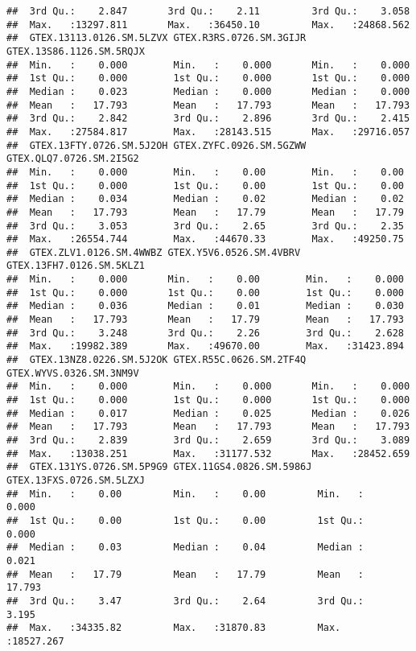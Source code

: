 \documentclass[
]{article}
\begin{document}
\begin{verbatim}
##  3rd Qu.:    2.847       3rd Qu.:    2.11         3rd Qu.:    3.058      
##  Max.   :13297.811       Max.   :36450.10         Max.   :24868.562      
##  GTEX.13113.0126.SM.5LZVX GTEX.R3RS.0726.SM.3GIJR GTEX.13S86.1126.SM.5RQJX
##  Min.   :    0.000        Min.   :    0.000       Min.   :    0.000       
##  1st Qu.:    0.000        1st Qu.:    0.000       1st Qu.:    0.000       
##  Median :    0.023        Median :    0.000       Median :    0.000       
##  Mean   :   17.793        Mean   :   17.793       Mean   :   17.793       
##  3rd Qu.:    2.842        3rd Qu.:    2.896       3rd Qu.:    2.415       
##  Max.   :27584.817        Max.   :28143.515       Max.   :29716.057       
##  GTEX.13FTY.0726.SM.5J2OH GTEX.ZYFC.0926.SM.5GZWW GTEX.QLQ7.0726.SM.2I5G2
##  Min.   :    0.000        Min.   :    0.00        Min.   :    0.00       
##  1st Qu.:    0.000        1st Qu.:    0.00        1st Qu.:    0.00       
##  Median :    0.034        Median :    0.02        Median :    0.02       
##  Mean   :   17.793        Mean   :   17.79        Mean   :   17.79       
##  3rd Qu.:    3.053        3rd Qu.:    2.65        3rd Qu.:    2.35       
##  Max.   :26554.744        Max.   :44670.33        Max.   :49250.75       
##  GTEX.ZLV1.0126.SM.4WWBZ GTEX.Y5V6.0526.SM.4VBRV GTEX.13FH7.0126.SM.5KLZ1
##  Min.   :    0.000       Min.   :    0.00        Min.   :    0.000       
##  1st Qu.:    0.000       1st Qu.:    0.00        1st Qu.:    0.000       
##  Median :    0.036       Median :    0.01        Median :    0.030       
##  Mean   :   17.793       Mean   :   17.79        Mean   :   17.793       
##  3rd Qu.:    3.248       3rd Qu.:    2.26        3rd Qu.:    2.628       
##  Max.   :19982.389       Max.   :49670.00        Max.   :31423.894       
##  GTEX.13NZ8.0226.SM.5J2OK GTEX.R55C.0626.SM.2TF4Q GTEX.WYVS.0326.SM.3NM9V
##  Min.   :    0.000        Min.   :    0.000       Min.   :    0.000      
##  1st Qu.:    0.000        1st Qu.:    0.000       1st Qu.:    0.000      
##  Median :    0.017        Median :    0.025       Median :    0.026      
##  Mean   :   17.793        Mean   :   17.793       Mean   :   17.793      
##  3rd Qu.:    2.839        3rd Qu.:    2.659       3rd Qu.:    3.089      
##  Max.   :13038.251        Max.   :31177.532       Max.   :28452.659      
##  GTEX.131YS.0726.SM.5P9G9 GTEX.11GS4.0826.SM.5986J GTEX.13FXS.0726.SM.5LZXJ
##  Min.   :    0.00         Min.   :    0.00         Min.   :    0.000       
##  1st Qu.:    0.00         1st Qu.:    0.00         1st Qu.:    0.000       
##  Median :    0.03         Median :    0.04         Median :    0.021       
##  Mean   :   17.79         Mean   :   17.79         Mean   :   17.793       
##  3rd Qu.:    3.47         3rd Qu.:    2.64         3rd Qu.:    3.195       
##  Max.   :34335.82         Max.   :31870.83         Max.   :18527.267
\end{verbatim}
\end{document}
